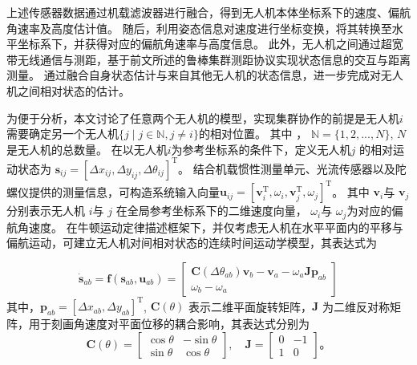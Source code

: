 上述传感器数据通过机载滤波器进行融合，得到无人机本体坐标系下的速度、偏航角速率及高度估计值。
随后，利用姿态信息对速度进行坐标变换，将其转换至水平坐标系下，并获得对应的偏航角速率与高度信息。
此外，无人机之间通过超宽带无线通信与测距，基于前文所述的鲁棒集群测距协议实现状态信息的交互与距离测量。
通过融合自身状态估计与来自其他无人机的状态信息，进一步完成对无人机之间相对状态的估计。

为便于分析，本文讨论了任意两个无人机的模型，实现集群协作的前提是无人机$i$需要确定另一个无人机$\{j\mid j\in\mathbb{N}, j\neq i\}$的相对位置。
其中 ， $\mathbb{N}=\{1,2,...,N \}$, $N$是无人机的总数量。
在以无人机$i$为参考坐标系的条件下，定义无人机$j$ 的相对运动状态为 $\boldsymbol{s}_{i j}=\left[\Delta x_{ij}, \Delta y_{i j}, \Delta \theta_{ij}\right]^{\mathrm{T}}$。
结合机载惯性测量单元、光流传感器以及陀螺仪提供的测量信息，可构造系统输入向量$\boldsymbol{u}_{ij}=\left[\boldsymbol{v}_{i}^{\mathrm{T}}, \omega_{i}, \boldsymbol{v}_{j}^{\mathrm{T}}, \omega_{j}\right]^{\mathrm{T}}$。
其中 $\boldsymbol{v}_{i}$​ 与 $\boldsymbol{v}_{j}$分别表示无人机 $i$与 $j$ 在全局参考坐标系下的二维速度向量，
 $\omega_{i}$ ​ 与 $\omega_{j}$ ​ 为对应的偏航角速度。
在牛顿运动定律描述框架下，并仅考虑无人机在水平平面内的平移与偏航运动，可建立无人机对间相对状态的连续时间运动学模型，其表达式为

  \begin{equation}
\dot{\boldsymbol{s}}_{a b}=\boldsymbol{f}\left(\boldsymbol{s}_{a b}, \boldsymbol{u}_{a b}\right)=\left[\begin{array}{c}
\boldsymbol{C}\left(\Delta \theta_{a b}\right) \boldsymbol{v}_{b}-\boldsymbol{v}_{a}-\omega_{a} \boldsymbol{J} \boldsymbol{p}_{a b} \\
\omega_{b}-\omega_{a}
\end{array}\right]
\end{equation}
其中，$\boldsymbol{p}_{a b}=\left[\Delta x_{a b}, \Delta y_{a b}\right]^{\mathrm{T}}$,
$\boldsymbol{C}(\theta)$ 表示二维平面旋转矩阵，$\boldsymbol{J}$ 为二维反对称矩阵，用于刻画角速度对平面位移的耦合影响，其表达式分别为
\begin{equation}
\boldsymbol{C}(\theta)=
\begin{bmatrix}
\cos \theta & -\sin \theta \\
\sin \theta & \cos \theta
\end{bmatrix},
\quad
\boldsymbol{J}=
\begin{bmatrix}
0 & -1 \\
1 & 0  
\end{bmatrix}\text{。}
\end{equation}

